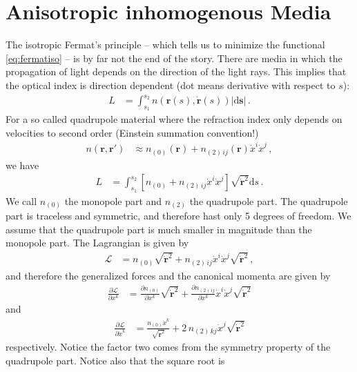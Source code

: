 \documentclass[12pt,a4paper,twoside,openright,BCOR10mm,headsepline,titlepage,abstracton,chapterprefix,final]{scrreprt}
\newcommand\Vector[1]{{\mathbf{#1}}}
\begin{document}
\section{Anisotropic inhomogenous Media}
The isotropic Fermat's principle -- which tells us to minimize the functional \eqref{eq:fermatiso} -- is by far not the end of the
story. There are media in which the propagation of light depends on the direction of the light rays. This implies that the
optical index is direction dependent (dot means derivative with respect to $s$):
\begin{align}
 L &= \int_{s_1}^{s_2} n(\Vector{r}(s), \dot{\Vector{r}}(s)) |\text{d}\Vector{s}|\,.\label{eq:fermataniso}
\end{align}
For a so called quadrupole material where the refraction index only depends on velocities to second order (Einstein summation convention!)
\begin{align}
  n(\Vector{r}, \Vector{r}') &\approx n_{(0)}(\Vector{r}) + n_{(2)\,ij}(\Vector{r}) \dot{x}^i \dot{x}^j\,,
\end{align}
we have 
\begin{align}
  L &= \int_{s_1}^{s_2} \left[n_{(0)} + n_{(2)\,ij} \dot{x}^i \dot{x}^j \right] \sqrt{\dot{\Vector{r}}^2} \text{d}s\,.\label{eq:fermataniso2}
\end{align}
We call $n_{(0)}$ the monopole part and $n_{(2)}$ the quadrupole part. The quadrupole part is traceless and symmetric, and therefore 
hast only 5 degrees of freedom. We assume that the quadrupole part is much smaller in magnitude than the monopole part. The Lagrangian is given by
\begin{align}
  \mathcal{L} &= n_{(0)} \sqrt{\dot{\Vector{r}}^2} + n_{(2)\,ij} \dot{x}^i \dot{x}^j \sqrt{\dot{\Vector{r}}^2}\,,
\end{align}
and therefore the generalized forces and the canonical momenta are given by
\begin{align}
  \frac{\partial \mathcal{L}}{\partial x^k} &= \frac{\partial n_{(0)}}{\partial x^k} \sqrt{\dot{\Vector{r}}^2} 
+ \frac{\partial n_{(2)\,ij}}{\partial x^k} \dot{x}^i \dot{x}^j \sqrt{\dot{\Vector{r}}^2}
\end{align}
and
\begin{align}
 \frac{\partial \mathcal{L}}{\partial \dot{x}^k} &= \frac{n_{(0)} \dot{x}^k}{\sqrt{\dot{\Vector{r}}^2}}
+ 2\,n_{(2)\,kj} \dot{x}^j \sqrt{\dot{\Vector{r}}^2}
\end{align}
respectively. Notice the factor two comes from the symmetry property of the quadrupole part. Notice also that the square root is
\end{document}

